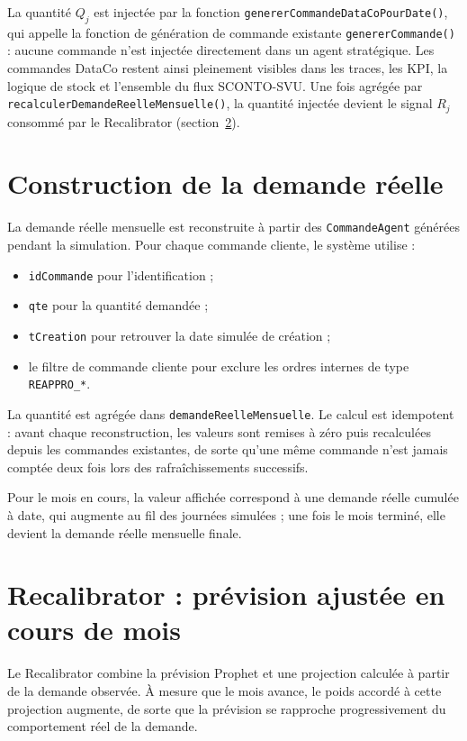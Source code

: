 \documentclass[11pt,a4paper]{article}
\newcommand{\code}[1]{\texttt{#1}}
\begin{document}
La quantité \(Q_j\) est injectée par la fonction \code{genererCommandeDataCoPourDate()}, qui appelle la fonction de génération de commande existante \code{genererCommande()} : aucune commande n'est injectée directement dans un agent stratégique. Les commandes DataCo restent ainsi pleinement visibles dans les traces, les KPI, la logique de stock et l'ensemble du flux SCONTO-SVU. Une fois agrégée par \code{recalculerDemandeReelleMensuelle()}, la quantité injectée devient le signal \(R_j\) consommé par le Recalibrator (section~\ref{sec:recalibrator}).

\section{Construction de la demande réelle}

La demande réelle mensuelle est reconstruite à partir des \code{CommandeAgent} générées pendant la simulation. Pour chaque commande cliente, le système utilise :

\begin{itemize}[leftmargin=1.5em]
  \item \code{idCommande} pour l'identification ;
  \item \code{qte} pour la quantité demandée ;
  \item \code{tCreation} pour retrouver la date simulée de création ;
  \item le filtre de commande cliente pour exclure les ordres internes de type \code{REAPPRO\_*}.
\end{itemize}

La quantité est agrégée dans \code{demandeReelleMensuelle}. Le calcul est idempotent : avant chaque reconstruction, les valeurs sont remises à zéro puis recalculées depuis les commandes existantes, de sorte qu'une même commande n'est jamais comptée deux fois lors des rafraîchissements successifs.

Pour le mois en cours, la valeur affichée correspond à une demande réelle cumulée à date, qui augmente au fil des journées simulées ; une fois le mois terminé, elle devient la demande réelle mensuelle finale.

\section{Recalibrator : prévision ajustée en cours de mois}
\label{sec:recalibrator}

Le Recalibrator combine la prévision Prophet et une projection calculée à partir de la demande observée. À mesure que le mois avance, le poids accordé à cette projection augmente, de sorte que la prévision se rapproche progressivement du comportement réel de la demande.
\end{document}
